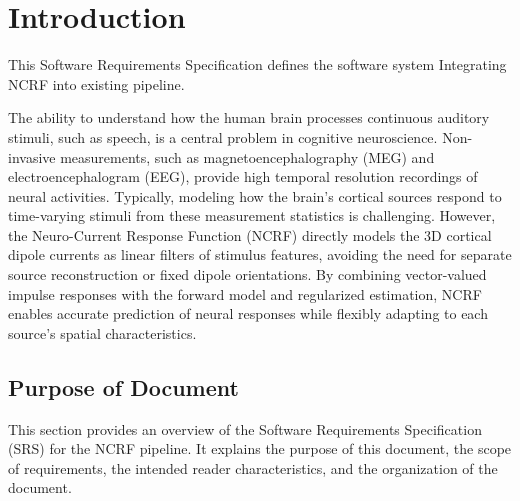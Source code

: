 \documentclass[12pt]{article}
\renewcommand{\progname}{Integrating NCRF into existing pipeline}
\begin{document}





\section{Introduction}

This Software Requirements Specification defines the software system \progname{}.

The ability to understand how the human brain processes continuous auditory stimuli, such as speech, is a central problem in cognitive neuroscience. Non-invasive measurements, such as magnetoencephalography (MEG) and electroencephalogram (EEG), provide high temporal resolution recordings of neural activities.
Typically, modeling how the brain's cortical sources respond to time-varying stimuli from these measurement statistics is challenging.
However, the Neuro-Current Response Function (NCRF) directly models the 3D cortical dipole currents as linear filters of stimulus features, avoiding the need for separate source reconstruction or fixed dipole orientations. By combining vector-valued impulse responses with the forward model and regularized estimation, NCRF enables accurate prediction of neural responses while flexibly adapting to each source's spatial characteristics.

\subsection{Purpose of Document}
This section provides an overview of the Software Requirements Specification (SRS) for the NCRF pipeline. It explains the purpose of this document, the scope of requirements, the intended reader characteristics, and the organization of the document.
\end{document}
